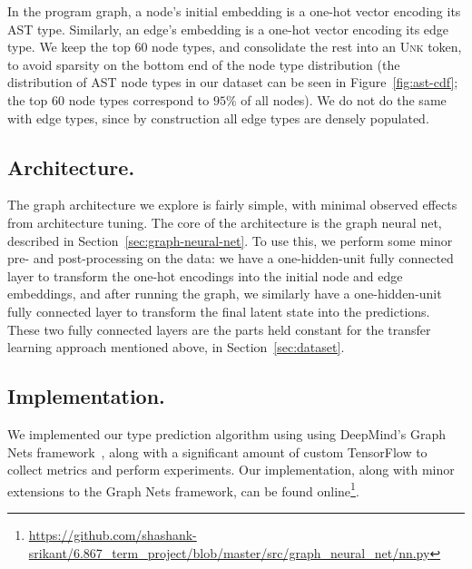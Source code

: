 In the program graph, a node's initial embedding is a one-hot vector encoding its AST type.
Similarly, an edge's embedding is a one-hot vector encoding its edge type.
We keep the top 60 node types, and consolidate the rest into an \textsc{Unk} token, to avoid sparsity on the bottom end of the node type distribution (the distribution of AST node types in our dataset can be seen in Figure~\ref{fig:ast-cdf}; the top 60 node types correspond to $95\%$ of all nodes).
We do not do the same with edge types, since by construction all edge types are densely populated.

\subsection{Architecture.}

The graph architecture we explore is fairly simple, with minimal observed effects from architecture tuning.
The core of the architecture is the graph neural net, described in Section~\ref{sec:graph-neural-net}.
To use this, we perform some minor pre- and post-processing on the data: we have a one-hidden-unit fully connected layer to transform the one-hot encodings into the initial node and edge embeddings, and after running the graph, we similarly have a one-hidden-unit fully connected layer to transform the final latent state into the predictions.
These two fully connected layers are the parts held constant for the transfer learning approach mentioned above, in Section~\ref{sec:dataset}.

\subsection{Implementation.}

We implemented our type prediction algorithm using using DeepMind's Graph Nets framework~\cite{deepmind2018graph}, along with a significant amount of custom TensorFlow to collect metrics and perform experiments.
Our implementation, along with minor extensions to the Graph Nets framework, can be found online\footnote{\url{https://github.com/shashank-srikant/6.867_term_project/blob/master/src/graph_neural_net/nn.py}}.